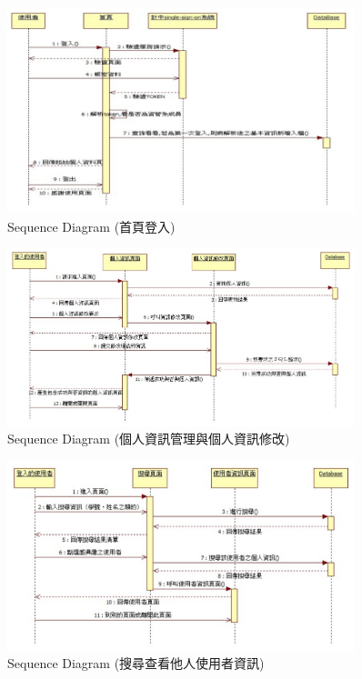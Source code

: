 \documentclass[11pt]{article}
\begin{document}
\begin{figure}[H]
\centering
\includegraphics[width=0.9\textwidth]{img/seq01.png}
\caption{Sequence Diagram (首頁登入)}
\end{figure}

\begin{figure}[H]
\centering
\includegraphics[width=0.9\textwidth]{img/seq02.png}
\caption{Sequence Diagram (個人資訊管理與個人資訊修改)}
\end{figure}

\begin{figure}[H]
\centering
\includegraphics[width=0.9\textwidth]{img/seq03.png}
\caption{Sequence Diagram (搜尋查看他人使用者資訊)}
\end{figure}
\end{document}
